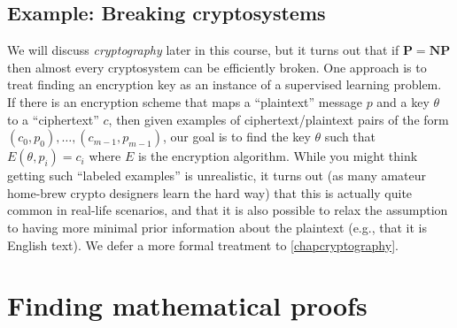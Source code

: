 \subsection{Example: Breaking
cryptosystems}\label{Example-Breaking-cryptosy}

We will discuss \emph{cryptography} later in this course, but it turns
out that if \(\mathbf{P}=\mathbf{NP}\) then almost every cryptosystem
can be efficiently broken. One approach is to treat finding an
encryption key as an instance of a supervised learning problem. If there
is an encryption scheme that maps a ``plaintext'' message \(p\) and a
key \(\theta\) to a ``ciphertext'' \(c\), then given examples of
ciphertext/plaintext pairs of the form
\((c_0,p_0),\ldots,(c_{m-1},p_{m-1})\), our goal is to find the key
\(\theta\) such that \(E(\theta,p_i)=c_i\) where \(E\) is the encryption
algorithm. While you might think getting such ``labeled examples'' is
unrealistic, it turns out (as many amateur home-brew crypto designers
learn the hard way) that this is actually quite common in real-life
scenarios, and that it is also possible to relax the assumption to
having more minimal prior information about the plaintext (e.g., that it
is English text). We defer a more formal treatment to
\cref{chapcryptography}.

\section{Finding mathematical proofs}\label{Finding-mathematical-proo}

